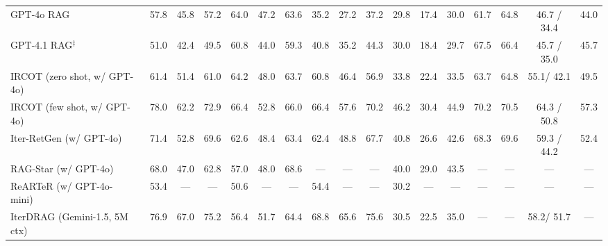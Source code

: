 \begin{table}[t]
{\begin{tabular}{l @{\hskip2.5pt} | c c c | c c c | c c c | c c c | c | c @{\hskip3.5pt}| c @{\hskip6pt} c}
\midrule
GPT-4o RAG~\cite{hurst2024gpt4o} & 57.8 &45.8 &57.2 &64.0 &47.2 &63.6 & 35.2 &27.2 &37.2 &29.8 &17.4 &30.0 & 61.7 &64.8 & 46.7 / 34.4& 44.0 \\
GPT-4.1 RAG$^{\ddagger}$~\citep{gpt-4.1} & 51.0 &42.4 &49.5 &60.8 &44.0 &59.3 & 40.8& 35.2 &44.3 &30.0 &18.4 &29.7 &{67.5} & {66.4} & 45.7 / 35.0 & 45.7\\
IRCOT (zero shot, w/ GPT-4o)~\citep{trivedi2023interleaving} & 61.4 &51.4 &61.0& {64.2}& {48.0} &63.7 &60.8 &46.4 &56.9&33.8& 22.4 &33.5& 63.7 &64.8 & 55.1/ 42.1 &49.5 \\
IRCOT (few shot, w/ GPT-4o)~\citep{trivedi2023interleaving} &  78.0 &62.2& 72.9&  66.4 & 52.8  &66.0& 66.4& 57.6  & 70.2  &46.2& 30.4& 44.9 & 70.2 & 70.5 & 64.3 / 50.8 & 57.3   \\
Iter-RetGen  (w/ GPT-4o)~\citep{shao2023enhancing}  & 71.4 & 52.8  & 69.6 &62.6  & 48.4  &63.4 &62.4  & 48.8  & 67.7 &40.8 & 26.6 &  42.6 &{68.3} &69.6 & 59.3 / 44.2& 52.4      \\
RAG-Star  (w/ GPT-4o)~\citep{jiang2024rag}        & {68.0}  & {47.0}  & {62.8} & 57.0 & {48.0} & {{68.6}} & --- & --- & --- & {40.0}  & {{29.0}} & {{43.5}} & ---& ---   & ---  & ---    \\
ReARTeR  (w/ GPT-4o-mini)~\citep{sun2025rearter} & 53.4 & --- &--- & 50.6 & --- & --- & {54.4}  & --- & --- & 30.2 & --- & ---  & ---  & ---   & ---  & ---    \\
IterDRAG (Gemini-1.5, 5M ctx)~\cite{yue2025inference}  & {76.9} &{67.0} &{75.2} &56.4 &{51.7} &{64.4} &{68.8} &{65.6} &{75.6} &30.5 &22.5 &35.0 &  ---      &  ---  & {58.2}/ {51.7} & ---  \\
\bottomrule
\end{tabular}%
}
\vspace{-2ex}
\label{tab:main_results}
\end{table}

